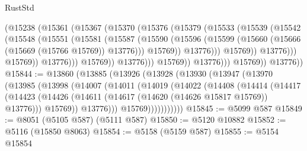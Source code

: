 \begin{lexlean}{RustStd}
\begin{coremodule}
{\begin{coremodule}
{{{{{{{{{{{{{{{{{{{{{{{{{{{{{{{                                (@15238
                                  (@15361
                                    (@15367
                                      (@15370
                                        (@15376
                                          (@15379
                                            (@15533
                                              (@15539
                                                (@15542
                                                  (@15548
                                                    (@15551
                                                      (@15581
                                                        (@15587
                                                          (@15590
                                                            (@15596
                                                              (@15599
                                                                (@15660
                                                                  (@15666
                                                                    (@15669 (@15766 @15769))
                                                                    @13776)))
                                                              @15769))
                                                          @13776)))
                                                    @15769))
                                                @13776)))
                                          @15769))
                                      @13776)))
                                @15769))
                            @13776)))
                      @15769))
                  @13776)))
            @15769))
        @13776))
@15844 := @13860
    (@13885
      (@13926
        (@13928
          (@13930
            (@13947
              (@13970
                (@13985
                  (@13998
                    (@14007
                      (@14011
                        (@14019
                          (@14022
                            (@14408
                              (@14414
                                (@14417
                                  (@14423
                                    (@14426
                                      (@14611 (@14617 (@14620 (@14626 @15817 @15769)) @13776)))
                                    @15769))
                                @13776)))
                          @15769)))))))))))
@15845 := @5099 @587
@15849 := @8051 (@5105 @587) (@5111 @587)
@15850 := @5120 @10882
@15852 := @5116 (@15850 @8063)
@15854 := @5158 (@5159 @587)
@15855 := @5154 @15854
}}}}}}}}}}}}}}}}}}}}}}}}}}}}}}}
\end{coremodule}}
\end{coremodule}
\end{lexlean}

